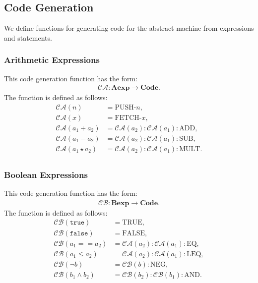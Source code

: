 \vfill

\subsection{Code Generation}

We define functions for generating code for the abstract machine from
expressions and statements.

\subsubsection{Arithmetic Expressions}

This code generation function has the form: \begin{gather*}
  \mathcal{CA} : \textbf{Aexp} \to \textbf{Code}.
\end{gather*} The function is defined as follows: \begin{align*}
  \mathcal{CA}(n) &= \text{PUSH-}n, \\
  \mathcal{CA}(x) &= \text{FETCH-}x, \\
  \mathcal{CA}(a_1 + a_2) &= \mathcal{CA}(a_2):\mathcal{CA}(a_1):\text{ADD}, \\
  \mathcal{CA}(a_1 - a_2) &= \mathcal{CA}(a_2):\mathcal{CA}(a_1):\text{SUB}, \\
  \mathcal{CA}(a_1 \star a_2) &= \mathcal{CA}(a_2):\mathcal{CA}(a_1):\text{MULT}. \\
\end{align*}

\subsubsection{Boolean Expressions}

This code generation function has the form: \begin{gather*}
  \mathcal{CB} : \textbf{Bexp} \to \textbf{Code}.
\end{gather*} The function is defined as follows: \begin{align*}
  \mathcal{CB}(\texttt{true}) &= \text{TRUE}, \\
  \mathcal{CB}(\texttt{false}) &= \text{FALSE}, \\
  \mathcal{CB}(a_1 == a_2) &= \mathcal{CA}(a_2):\mathcal{CA}(a_1):\text{EQ}, \\
  \mathcal{CB}(a_1 \leq a_2) &= \mathcal{CA}(a_2):\mathcal{CA}(a_1):\text{LEQ}, \\
  \mathcal{CB}(\neg b) &= \mathcal{CB}(b):\text{NEG}, \\
  \mathcal{CB}(b_1 \land b_2) &= \mathcal{CB}(b_2):\mathcal{CB}(b_1):\text{AND}.\\
\end{align*}

